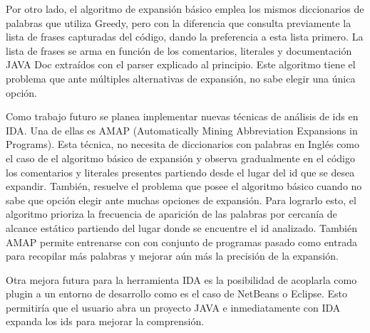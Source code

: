 \documentclass[a4paper,12pt]{report}
\begin{document}
Por otro lado, el algoritmo de expansión básico emplea los mismos diccionarios de palabras que utiliza Greedy, pero con la diferencia que consulta previamente la lista de frases capturadas del código, dando la preferencia a esta lista primero. La lista de frases se arma en función de los comentarios, literales y documentación JAVA Doc extraídos con el parser explicado al principio. Este algoritmo tiene el problema que ante múltiples alternativas de expansión, no sabe elegir una única opción.

Como trabajo futuro se planea implementar nuevas técnicas de análisis de ids en IDA. Una de ellas es AMAP (Automatically Mining Abbreviation Expansions in Programs). Esta técnica, no necesita de diccionarios con palabras en Inglés como el caso de el algoritmo básico de expansión y observa gradualmente en el código los comentarios y literales presentes partiendo desde el lugar del id que se desea expandir. También, resuelve el problema que posee el algoritmo básico cuando no sabe que opción elegir ante muchas opciones de expansión. Para lograrlo esto, el algoritmo prioriza la frecuencia de aparición de las palabras por cercanía de alcance estático partiendo del lugar donde se encuentre el id analizado. También AMAP permite entrenarse con con conjunto de programas pasado como entrada para recopilar más palabras y mejorar aún más la precisión de la expansión.

Otra mejora futura para la herramienta IDA es la posibilidad de acoplarla como plugin a un entorno de desarrollo como es el caso de NetBeans o Eclipse. Esto permitiría que el usuario abra un proyecto JAVA e inmediatamente con IDA expanda los ids para mejorar la comprensión.






\end{document}
